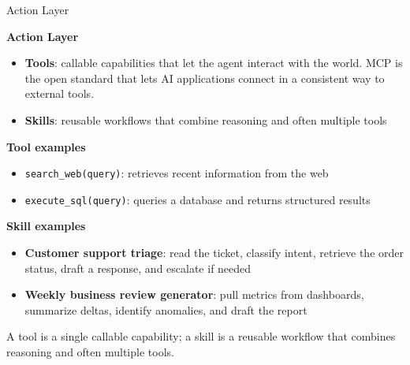 \begin{frame}{Action Layer}

\textbf{Action Layer}
\begin{itemize}\setlength\itemsep{0.2em}
  \item \textbf{Tools}: callable capabilities that let the agent interact with the world. MCP is the open standard that lets AI applications connect in a consistent way to external tools.
  \item \textbf{Skills}: reusable workflows that combine reasoning and often multiple tools
\end{itemize}

\vspace{0.4em}

\textbf{Tool examples}
\begin{itemize}\setlength\itemsep{0.15em}
  \item \texttt{search\_web(query)}: retrieves recent information from the web
  \item \texttt{execute\_sql(query)}: queries a database and returns structured results
\end{itemize}

\textbf{Skill examples}
\begin{itemize}\setlength\itemsep{0.15em}
  \item \textbf{Customer support triage}: read the ticket, classify intent, retrieve the order status, draft a response, and escalate if needed
  \item \textbf{Weekly business review generator}: pull metrics from dashboards, summarize deltas, identify anomalies, and draft the report
\end{itemize}

\vspace{0.2em}
A tool is a single callable capability; a skill is a reusable workflow that combines reasoning and often multiple tools.

\end{frame}

